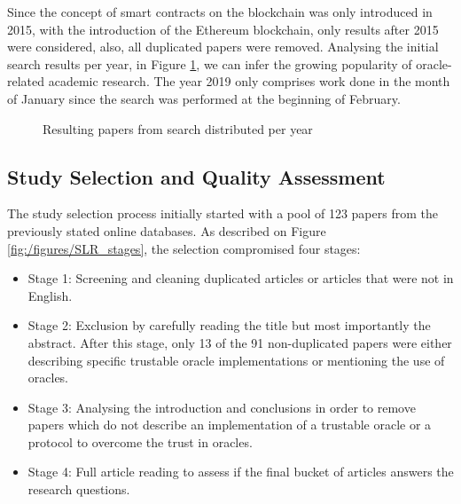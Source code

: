 Since the concept of smart contracts on the blockchain was only introduced in 2015, with the introduction of the Ethereum blockchain, only results after 2015 were considered, also, all duplicated papers were removed. Analysing the initial search results per year, in Figure \ref{search-results-per-year}, we can infer the growing popularity of oracle-related academic research. The year 2019 only comprises work done in the month of January since the search was performed at the beginning of February.

\begin{figure}[H]
  \centering
  \caption{Resulting papers from search distributed per year}
  \label{search-results-per-year}
\end{figure}


\subsection{Study Selection and Quality Assessment}

The study selection process initially started with a pool of 123 papers from the previously stated online databases. As described on Figure \ref{fig:/figures/SLR_stages}, the selection compromised four stages:
\begin{itemize}
  \item Stage 1: Screening and cleaning duplicated articles or articles that were not in English.
  \item Stage 2: Exclusion by carefully reading the title but most importantly the abstract. After this stage, only 13 of the 91 non-duplicated papers were either describing specific trustable oracle implementations or mentioning the use of oracles.
  \item Stage 3: Analysing the introduction and conclusions in order to remove papers which do not describe an implementation of a trustable oracle or a protocol to overcome the trust in oracles.
  \item Stage 4: Full article reading to assess if the final bucket of articles answers the research questions.
\end{itemize}

